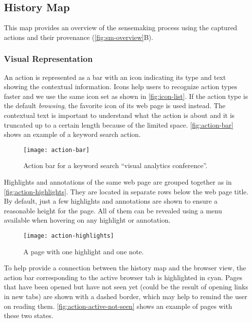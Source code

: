\subsection{History Map}
\label{sub:collection}
This map provides an overview of the sensemaking process using the captured actions and their provenance (\autoref{fig:sm-overview}B).

\subsubsection{Visual Representation}
An action is represented as a bar with an icon indicating its type and text showing the contextual information. Icons help users to recognize action types faster and we use the same icon set as shown in \autoref{fig:icon-list}. If the action type is the default \textit{browsing}, the favorite icon of its web page is used instead. The contextual text is important to understand what the action is about and it is truncated up to a certain length because of the limited space. \autoref{fig:action-bar} shows an example of a keyword search action.

\begin{figure}[!htb]
	\centering
	\texttt{[image: action-bar]}
	\caption{Action bar for a keyword search ``visual analytics conference''.}
	\label{fig:action-bar}
\end{figure}

Highlights and annotations of the same web page are grouped together as in \autoref{fig:action-highlights}. They are located in separate rows below the web page title. By default, just a few highlights and annotations are shown to ensure a reasonable height for the page. All of them can be revealed using a menu available when hovering on any highlight or annotation.

\begin{figure}[!htb]
	\centering
	\texttt{[image: action-highlights]}
	\caption{A page with one highlight and one note.}
	\label{fig:action-highlights}
\end{figure}

To help provide a connection between the history map and the browser view, the action bar corresponding to the active browser tab is highlighted in cyan. Pages that have been opened but have not seen yet (could be the result of opening links in new tabs) are shown with a dashed border, which may help to remind the user on reading them. \autoref{fig:action-active-not-seen} shows an example of pages with these two states.

